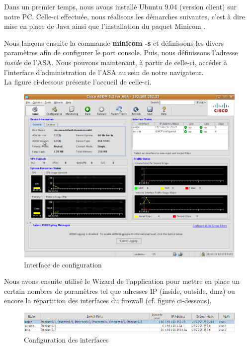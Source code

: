 \documentclass[a4paper,12pt]{article}
\begin{document}
Dans un premier temps, nous avons installé Ubuntu 9.04 (version client) sur notre PC. Celle-ci effectuée, nous réalisons les démarches suivantes, c'est à dire mise en place de Java ainsi que l'installation du paquet \og Minicom \fg.

Nous lançons ensuite la commande \textbf{minicom -s} et définissons les divers paramètres afin de configurer le port console. Puis, nous définissons l'adresse \textit{inside} de l'ASA. Nous pouvons maintenant, à partir de celle-ci, accéder à l'interface d'administration de l'ASA au sein de notre navigateur.\\La figure ci-dessous présente l'accueil de celle-ci. 

\begin{figure}[H]
	\center
	\includegraphics[width=15cm]{img/1-Interfaceconfigfw.png}
	\caption{Interface de configuration}
\end{figure}

Nous avons ensuite utilisé le \og Wizard \fg de l'application pour mettre en place un certain nombres de paramètres tel que adresses IP (inside, outside, dmz) ou encore la répartition des interfaces du firewall (cf. figure ci-dessous). 
\begin{figure}[H]
	\center
	\includegraphics[width=15cm]{img/2-Interfaces.png}
	\caption{Configuration des interfaces}
\end{figure}
\end{document}
